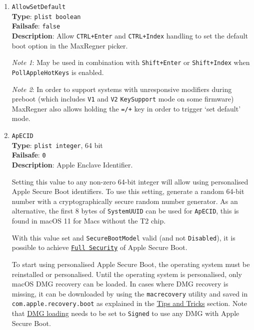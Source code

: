 \documentclass[]{article}
\begin{document}
\begin{enumerate}

\item
  \texttt{AllowSetDefault}\\
  \textbf{Type}: \texttt{plist\ boolean}\\
  \textbf{Failsafe}: \texttt{false}\\
  \textbf{Description}: Allow \texttt{CTRL+Enter} and \texttt{CTRL+Index} handling
  to set the default boot option in the MaxRegner picker.

  \emph{Note 1}: May be used in combination
  with \texttt{Shift+Enter} or \texttt{Shift+Index} when \texttt{PollAppleHotKeys} is
  enabled.

  \emph{Note 2}: In order to support systems with unresponsive modifiers during preboot
  (which includes \texttt{V1} and \texttt{V2} \texttt{KeySupport} mode on some firmware)
  MaxRegner also allows holding the \texttt{=/+} key in order to trigger `set default' mode.

\item
  \texttt{ApECID}\\
  \textbf{Type}: \texttt{plist\ integer}, 64 bit\\
  \textbf{Failsafe}: \texttt{0}\\
  \textbf{Description}: Apple Enclave Identifier.

  Setting this value to any non-zero 64-bit integer will allow using
  personalised Apple Secure Boot identifiers. To use this setting,
  generate a random 64-bit number with a cryptographically secure
  random number generator. As an alternative, the first 8 bytes of \texttt{SystemUUID}
  can be used for \texttt{ApECID}, this is found in macOS 11 for Macs without
  the T2 chip.

  With this value set and \texttt{SecureBootModel} valid
  (and not \texttt{Disabled}), it is possible to achieve
  \href{https://support.apple.com/en-us/HT208330}{\texttt{Full Security}} of Apple
  Secure Boot.

  To start using personalised Apple Secure Boot, the operating system must be
  reinstalled or personalised. Until the operating system is personalised,
  only macOS DMG recovery can be loaded. In cases where DMG recovery is missing,
  it can be downloaded by using the \texttt{macrecovery} utility and saved in
  \texttt{com.apple.recovery.boot} as explained in the
  \hyperref[reinstallmacos]{Tips and Tricks} section. Note that
  \hyperref[securedmgloading]{DMG loading} needs to be set to \texttt{Signed}
  to use any DMG with Apple Secure Boot.


\end{enumerate}
\end{document}
